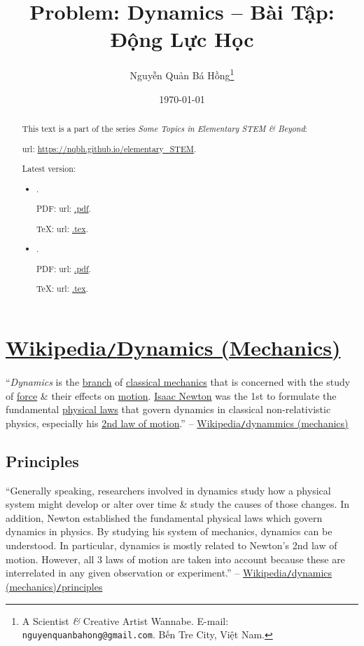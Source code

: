 \documentclass{article}
\title{Problem: Dynamics -- Bài Tập: Động Lực Học}
\author{Nguyễn Quản Bá Hồng\footnote{A Scientist {\it\&} Creative Artist Wannabe. E-mail: {\tt nguyenquanbahong@gmail.com}. Bến Tre City, Việt Nam.}}
\date{\today}
\begin{document}
\maketitle
\begin{abstract}
	This text is a part of the series {\it Some Topics in Elementary STEM \& Beyond}:
	
	{\sc url}: \url{https://nqbh.github.io/elementary_STEM}.
	
	Latest version:
	\begin{itemize}
		\item {\it }.
		
		PDF: {\sc url}: \url{.pdf}.
		
		\TeX: {\sc url}: \url{.tex}.
		\item {\it }.
		
		PDF: {\sc url}: \url{.pdf}.
		
		\TeX: {\sc url}: \url{.tex}.
	\end{itemize}
\end{abstract}
\tableofcontents
\newpage


\section{\href{https://en.wikipedia.org/wiki/Dynamics_(mechanics)}{Wikipedia\texttt{/}Dynamics (Mechanics)}}
``{\it Dynamics} is the \href{https://en.wikipedia.org/wiki/Branch_(academia)#Physics}{branch} of \href{https://en.wikipedia.org/wiki/Classical_mechanics}{classical mechanics} that is concerned with the study of \href{https://en.wikipedia.org/wiki/Force_(physics)}{force} \& their effects on \href{https://en.wikipedia.org/wiki/Motion_(physics)}{motion}. \href{https://en.wikipedia.org/wiki/Isaac_Newton}{Isaac Newton} was the 1st to formulate the fundamental \href{https://en.wikipedia.org/wiki/Physical_law}{physical laws} that govern dynamics in classical non-relativistic physics, especially his \href{https://en.wikipedia.org/wiki/Second_law_of_motion}{2nd law of motion}.'' -- \href{https://en.wikipedia.org/wiki/Dynamics_(mechanics)}{Wikipedia\texttt{/}dynammics (mechanics)}

\subsection{Principles}
``Generally speaking, researchers involved in dynamics study how a physical system might develop or alter over time \& study the causes of those changes. In addition, Newton established the fundamental physical laws which govern dynamics in physics. By studying his system of mechanics, dynamics can be understood. In particular, dynamics is mostly related to Newton's 2nd law of motion. However, all 3 laws of motion are taken into account because these are interrelated in any given observation or experiment.'' -- \href{https://en.wikipedia.org/wiki/Dynamics_(mechanics)#Principles}{Wikipedia\texttt{/}dynamics (mechanics)\texttt{/}principles}
\end{document}
